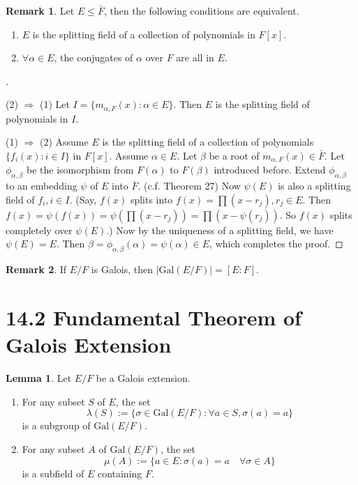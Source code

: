 \documentclass[12pt]{article}
\theoremstyle{definition}
\newtheorem{lem}{Lemma}
\newtheorem{rem}{Remark}
\newenvironment{proofs}[1][\proofname]{%
  \begin{proof}[#1]$ $\par\nobreak\ignorespaces
}{%
  \end{proof}
}
\begin{document}
\begin{rem}
	Let $E \leq \bar{F}$, then the following conditions are equivalent.
	\begin{enumerate}
		\item[(1)] $E$ is the splitting field of a collection of polynomials in $F[x]$.

		\item[(2)] $\forall \alpha \in E$, the conjugates of $\alpha$ over $F$ are all in $E$.
	\end{enumerate}
\end{rem}

\begin{proofs}
	\par (2) $\Rightarrow$ (1) Let $I = \{ m_{\alpha, F}(x): \alpha \in E\}$.
	Then $E$ is the splitting field of polynomials in $I$.

	\par (1) $\Rightarrow$ (2) Assume $E$ is the splitting field of a collection of polynomials $\{f_i(x): i \in I\}$ in $F[x]$.
	Assume $\alpha \in E$.
	Let $\beta$ be a root of $m_{\alpha, F}(x) \in \bar{F}$.
	Let $\phi_{\alpha, \beta}$ be the isomorphism from $F(\alpha)$ to $F(\beta)$ introduced before.
	Extend $\phi_{\alpha, \beta}$ to an embedding $\psi$ of $E$ into $\bar{F}$.
	(c.f. Theorem 27)
	Now $\psi(E)$ is also a splitting field of $f_i, i \in I$.
	(Say, $f(x)$ splits into $f(x) = \prod (x - r_j), r_j \in E$.
	Then $f(x) = \psi(f(x)) = \psi(\prod (x - r_j)) = \prod (x - \psi(r_j))$.
	So $f(x)$ splits completely over $\psi(E)$.)
	Now by the uniqueness of a splitting field, we have $\psi(E) = E$.
	Then $\beta = \phi_{\alpha, \beta}(\alpha) = \psi(\alpha) \in E$, which completes the proof.
\end{proofs}

\begin{rem}
	If $E/F$ is Galois, then $|\text{Gal}(E/F)| = [E:F]$.
\end{rem}

\section*{14.2 Fundamental Theorem of Galois Extension}

\begin{lem}
	Let $E/F$ be a Galois extension.
	\begin{enumerate}
		\item[(1)] For any subset $S$ of $E$, the set
			\[
				\lambda(S) := \{\sigma \in \text{Gal}\left( E/F  \right): \forall a \in S, \sigma(a) = a\}
			\]
			is a subgroup of $\text{Gal}(E/F)$.

		\item[(2)] For any subset $A$ of $\text{Gal}(E/F)$, the set
			\[
				\mu(A):= \{a \in E: \sigma(a) = a \quad \forall \sigma \in A\}
			\]
			is a subfield of $E$ containing $F$.
	\end{enumerate}
\end{lem}
\end{document}
